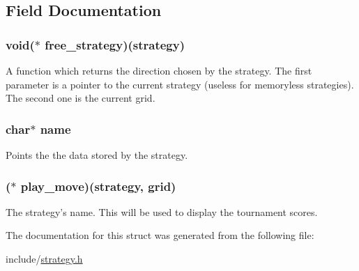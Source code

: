 \subsection{Field Documentation}
\hypertarget{structstrategy__s_a03f512455d12943d000c8287d130ac09}{
\subsubsection[{free\-\_\-strategy}]{\setlength{\rightskip}{0pt plus 5cm}void($\ast$ free\-\_\-strategy)({\bf strategy})}}\label{structstrategy__s_a03f512455d12943d000c8287d130ac09}
A function which returns the direction chosen by the strategy. The first parameter is a pointer to the current strategy (useless for memoryless strategies). The second one is the current grid. \hypertarget{structstrategy__s_a5ac083a645d964373f022d03df4849c8}{
\subsubsection[{name}]{\setlength{\rightskip}{0pt plus 5cm}char$\ast$ name}}\label{structstrategy__s_a5ac083a645d964373f022d03df4849c8}
Points the the data stored by the strategy. \hypertarget{structstrategy__s_ac4ec2cfabdd3e4b516c4164f83008809}{
\subsubsection[{play\-\_\-move}]{($\ast$ play\-\_\-move)({\bf strategy}, {\bf grid})}}\label{structstrategy__s_ac4ec2cfabdd3e4b516c4164f83008809}
The strategy's name. This will be used to display the tournament scores. 

The documentation for this struct was generated from the following file\-:\begin{DoxyCompactItemize}
\item 
include/\hyperlink{strategy_8h}{strategy.\-h}\end{DoxyCompactItemize}
